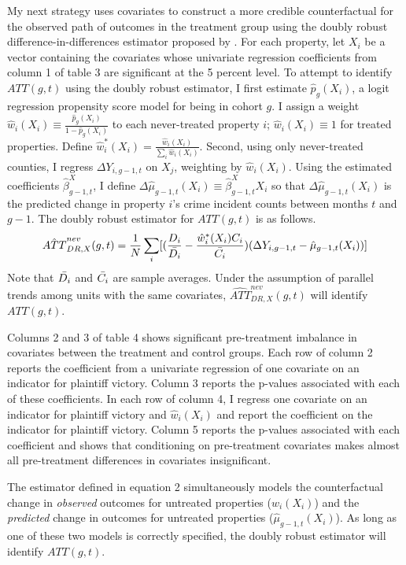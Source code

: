 \documentclass[12pt]{article}
\begin{document}
    My next strategy uses covariates to construct a more credible counterfactual for the observed path of outcomes in the treatment group using the doubly robust difference-in-differences estimator proposed by \cite{santanna_doubly_2018}. For each property, let $X_i$ be a vector containing the covariates whose univariate regression coefficients from column 1 of table 3 are significant at the 5 percent level. To attempt to identify $ATT(g, t)$ using the doubly robust estimator, I first estimate $\hat{p}_g(X_i)$, a logit regression propensity score model for being in cohort $g$. I assign a weight $\hat{w}_i(X_i) \equiv\frac{\hat{p}_g(X_i)}{1 - \hat{p}_g(X_i)}$ to each never-treated property $i$; $\hat{w}_i(X_i) \equiv 1$ for treated properties. Define $\hat{w}^*_i(X_i) = \frac{\hat{w}_i(X_i)}{\sum_i \hat{w}_i(X_i)}$. Second, using only never-treated counties, I regress $\Delta Y_{i, g-1, t}$ on $X_j$, weighting by $\hat{w}_i(X_i)$. Using the estimated coefficients $\hat{\beta}_{g-1, t}^{X}$, I define $\Delta \hat{\mu}_{g-1, t}(X_i) \equiv \hat{\beta}_{g-1, t}^{X}X_i$ so that $\Delta \hat{\mu}_{g-1, t}(X_i)$ is the predicted change in property $i$'s crime incident counts between months $t$ and $g-1$.
    The doubly robust estimator for $ATT(g, t)$ is as follows.
    \begin{align}
        \hat{ATT}^{nev}_{DR, X}(g,t) = \frac{1}{N}\sum_i[(\frac{D_i}{\Bar{D_i}} - \frac{\hat{w}^*_i(X_i)C_i}{\Bar{C_i}})(\Delta Y_{i, g-1, t} - \hat{\mu}_{g-1, t}(X_i))]
    \end{align}
    Note that $\Bar{D_i}$ and $\Bar{C_i}$ are sample averages. Under the assumption of parallel trends among units with the same covariates, $\hat{ATT}^{nev}_{DR, X}(g,t)$ will identify $ATT(g, t)$.
    

    Columns 2 and 3 of table 4 shows significant pre-treatment imbalance in covariates between the treatment and control groups. Each row of column 2 reports the coefficient from a univariate regression of one covariate on an indicator for plaintiff victory. Column 3 reports the p-values associated with each of these coefficients. In each row of column 4, I regress one covariate on an indicator for plaintiff victory and $\hat{w}_i(X_i)$ and report the coefficient on the indicator for plaintiff victory. Column 5 reports the p-values associated with each coefficient and shows that conditioning on pre-treatment covariates makes almost all pre-treatment differences in covariates insignificant.

    The estimator defined in equation 2 simultaneously models the counterfactual change in \emph{observed} outcomes for untreated properties ($\hat{w}_i(X_i)$) and the \emph{predicted} change in outcomes for untreated properties ($\hat{\mu}_{g-1, t}(X_i)$). As long as one of these two models is correctly specified, the doubly robust estimator will identify $ATT(g, t)$.
\end{document}
